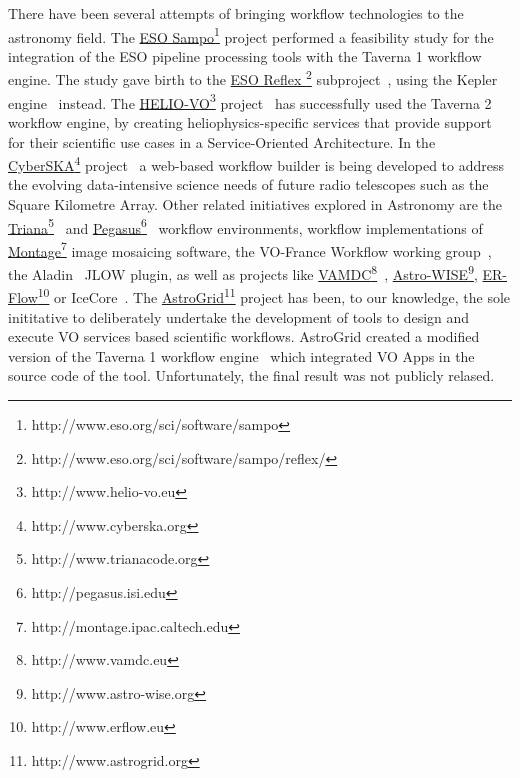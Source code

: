 \documentclass{aa}
\begin{document}
There have been several attempts of bringing workflow technologies to the astronomy field. The \href{http://www.eso.org/sci/software/sampo}{ESO Sampo}\footnote{http://www.eso.org/sci/software/sampo} project performed a feasibility study for the integration of the ESO pipeline processing tools with the Taverna 1 workflow engine. The study gave birth to the \href{http://www.eso.org/sci/software/sampo/reflex/}{ESO Reflex }\footnote{http://www.eso.org/sci/software/sampo/reflex/} subproject~\citep{Hook2009}, using the Kepler engine~\citep{Altintas2004} instead. The \href{http://www.helio-vo.eu/}{HELIO-VO}\footnote{http://www.helio-vo.eu} project~\citep{Bentley2013} has successfully used the Taverna 2 workflow engine, by creating heliophysics-specific services that provide support for their scientific use cases in a Service-Oriented Architecture. In the \href{http://www.cyberska.org}{CyberSKA}\footnote{http://www.cyberska.org} project~\citep{Kiddle2011} a web-based workflow builder is being developed to address the evolving data-intensive science needs of future radio telescopes such as the Square Kilometre Array. Other related initiatives explored in Astronomy are the \href{http://www.trianacode.org}{Triana}\footnote{http://www.trianacode.org}~\citep{Taylor2007} and \href{http://pegasus.isi.edu}{Pegasus}\footnote{http://pegasus.isi.edu}~\citep{Deelman:2005:PFM:1239649.1239653} workflow environments, workflow implementations of \href{http://montage.ipac.caltech.edu}{Montage}\footnote{http://montage.ipac.caltech.edu} image mosaicing software, the VO-France Workflow working group~\citep{Schaaff2008}, the Aladin~\citep{Bonnarel2000} JLOW plugin, as well as projects like \href{http://www.vamdc.eu}{VAMDC}\footnote{http://www.vamdc.eu}~\citep{Walton2011}, \href{http://www.astro-wise.org}{Astro-WISE}\footnote{http://www.astro-wise.org}, \href{http://www.erflow.eu}{ER-Flow}\footnote{http://www.erflow.eu} or IceCore~\citep{Maisala2012}. The \href{http://www.astrogrid.org}{AstroGrid}\footnote{http://www.astrogrid.org} project has been, to our knowledge, the sole inititative to deliberately undertake the development of tools to design and execute VO services based scientific workflows. AstroGrid created a modified version of the Taverna 1 workflow engine~\citep{Benson2009, Walton2010} which integrated VO Apps in the source code of the tool. Unfortunately, the final result was not publicly relased.
\end{document}
